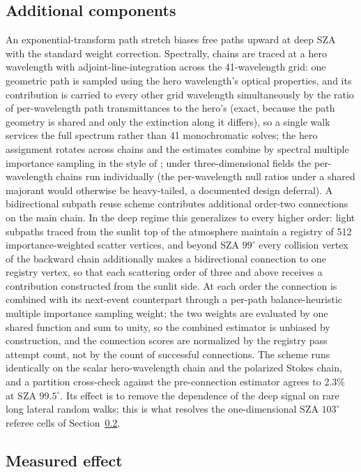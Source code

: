 \documentclass[preprint,12pt]{elsarticle}
\begin{document}
\subsection{Additional components}
\label{sec:components}

An exponential-transform path stretch biases free paths upward at deep
SZA with the standard weight correction. Spectrally, chains are traced at
a hero wavelength with adjoint-line-integration across the
41-wavelength grid: one geometric path is sampled using the hero
wavelength's optical properties, and its contribution is carried to
every other grid wavelength simultaneously by the ratio of
per-wavelength path transmittances to the hero's (exact, because the
path geometry is shared and only the extinction along it differs), so
a single walk services the full spectrum rather than 41 monochromatic
solves; the hero assignment rotates across chains and the estimates
combine by spectral multiple importance sampling in the style of
\citet{wilkie2014}; under
three-dimensional fields the per-wavelength chains run individually (the
per-wavelength null ratios under a shared majorant would otherwise be
heavy-tailed, a documented design deferral). A bidirectional subpath
reuse scheme contributes additional order-two connections on the main
chain. In the deep regime this generalizes to every higher order:
light subpaths traced from the sunlit top of the atmosphere maintain
a registry of 512 importance-weighted scatter vertices, and beyond
SZA $99^\circ$ every collision vertex of the backward chain
additionally makes a bidirectional connection to one registry vertex,
so that each scattering order of three and above receives a
contribution constructed from the sunlit side. At each order the
connection is combined with its next-event counterpart through a
per-path balance-heuristic multiple importance sampling weight; the
two weights are evaluated by one shared function and sum to unity, so
the combined estimator is unbiased by construction, and the
connection scores are normalized by the registry pass attempt count,
not by the count of successful connections. The scheme runs
identically on the scalar hero-wavelength chain and the polarized
Stokes chain, and a partition cross-check against the pre-connection
estimator agrees to 2.3\% at SZA $99.5^\circ$. Its effect is to
remove the dependence of the deep signal on rare long lateral random
walks; this is what resolves the one-dimensional SZA $103^\circ$
referee cells of Section~\ref{sec:cvresults}.

\subsection{Measured effect}
\label{sec:cvresults}
\end{document}
